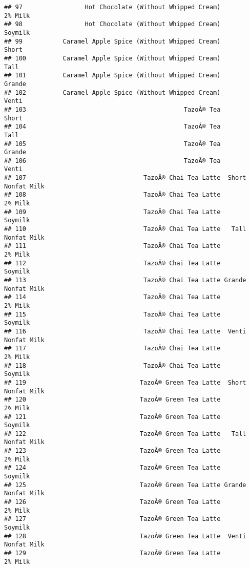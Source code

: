 \documentclass[
]{article}
\begin{document}
\begin{verbatim}
## 97                 Hot Chocolate (Without Whipped Cream)            2% Milk
## 98                 Hot Chocolate (Without Whipped Cream)            Soymilk
## 99           Caramel Apple Spice (Without Whipped Cream)              Short
## 100          Caramel Apple Spice (Without Whipped Cream)               Tall
## 101          Caramel Apple Spice (Without Whipped Cream)             Grande
## 102          Caramel Apple Spice (Without Whipped Cream)              Venti
## 103                                           TazoÂ® Tea              Short
## 104                                           TazoÂ® Tea               Tall
## 105                                           TazoÂ® Tea             Grande
## 106                                           TazoÂ® Tea              Venti
## 107                                TazoÂ® Chai Tea Latte  Short Nonfat Milk
## 108                                TazoÂ® Chai Tea Latte            2% Milk
## 109                                TazoÂ® Chai Tea Latte            Soymilk
## 110                                TazoÂ® Chai Tea Latte   Tall Nonfat Milk
## 111                                TazoÂ® Chai Tea Latte            2% Milk
## 112                                TazoÂ® Chai Tea Latte            Soymilk
## 113                                TazoÂ® Chai Tea Latte Grande Nonfat Milk
## 114                                TazoÂ® Chai Tea Latte            2% Milk
## 115                                TazoÂ® Chai Tea Latte            Soymilk
## 116                                TazoÂ® Chai Tea Latte  Venti Nonfat Milk
## 117                                TazoÂ® Chai Tea Latte            2% Milk
## 118                                TazoÂ® Chai Tea Latte            Soymilk
## 119                               TazoÂ® Green Tea Latte  Short Nonfat Milk
## 120                               TazoÂ® Green Tea Latte            2% Milk
## 121                               TazoÂ® Green Tea Latte            Soymilk
## 122                               TazoÂ® Green Tea Latte   Tall Nonfat Milk
## 123                               TazoÂ® Green Tea Latte            2% Milk
## 124                               TazoÂ® Green Tea Latte            Soymilk
## 125                               TazoÂ® Green Tea Latte Grande Nonfat Milk
## 126                               TazoÂ® Green Tea Latte            2% Milk
## 127                               TazoÂ® Green Tea Latte            Soymilk
## 128                               TazoÂ® Green Tea Latte  Venti Nonfat Milk
## 129                               TazoÂ® Green Tea Latte            2% Milk

\end{verbatim}
\end{document}
